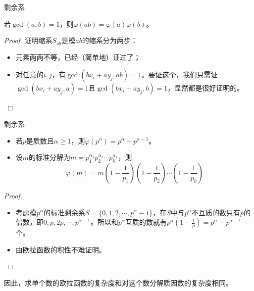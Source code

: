 \documentclass{ctexbeamer}        %
\begin{document}
\begin{frame}{剩余系}

\begin{theorem}[欧拉函数的积性]
    若$\gcd(a,b)=1$，则$\varphi(ab)=\varphi(a)\varphi(b)$。
\end{theorem}

\begin{proof}
	证明缩系$S_{ab}$是模$ab$的缩系分为两步：
	\begin{itemize}
		\item 元素两两不等，已经（简单地）证过了；
		\item 对任意的$i,j$，有$\gcd(bx_i+ay_j,ab)=1$。要证这个，我们只需证$\gcd(bx_i+ay_j,a)=1$且$\gcd(bx_i+ay_j,b)=1$，显然都是很好证明的。
	\end{itemize}
\end{proof}

\end{frame}

\begin{frame}{剩余系}

\begin{theorem}[欧拉函数计算公式]
    \begin{itemize}
		\item 若$p$是质数且$\alpha \ge 1$，则$\varphi(p^{\alpha})=p^{\alpha} - p^{\alpha-1}$。
		\item 设$m$的标准分解为$m=p_1^{\alpha_1}p_2^{\alpha_2}\cdots p_k^{\alpha_k}$，则$$\varphi(m)=m(1-\frac{1}{p_1})(1-\frac{1}{p_2})\cdots(1-\frac{1}{p_k})$$
	\end{itemize}
\end{theorem}

\begin{proof}
	\begin{itemize}
		\item 考虑模$p^{\alpha}$的标准剩余系$S=\lbrace 0,1,2,\cdots,p^{\alpha}-1 \rbrace$，在$S$中与$p^{\alpha}$不互质的数只有$p$的倍数，即$0,p,2p,\cdots,p^{\alpha-1}$。所以和$p^{\alpha}$互质的数就有$p^{\alpha}(1-\frac{1}{p})=p^{\alpha} - p^{\alpha-1}$个。
		\item 由欧拉函数的积性不难证明。
	\end{itemize}
\end{proof}

因此，求单个数的欧拉函数的复杂度和对这个数分解质因数的复杂度相同。

\end{frame}
\end{document}
